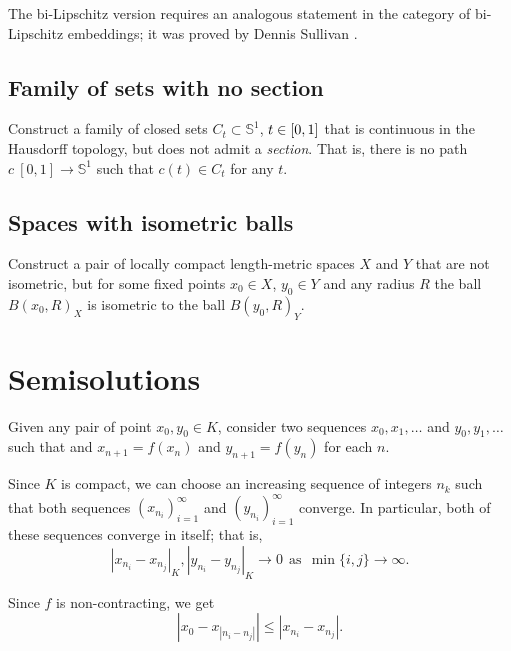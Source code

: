 The  bi-Lipschitz version requires 
an analogous statement in the category of bi-Lipschitz embeddings;
it was proved by
Dennis Sullivan \cite[see][]{sullivan}.

\subsection*{Family of sets with no section\easy}
\label{hausdorff-section} 

\begin{pr}
Construct a family of closed sets $C_t\subset\mathbb{S}^1$, $t\z\in [0,1]$ that is continuous in the Hausdorff topology, 
but does not admit a {}\emph{section}.
That is, there is no path $c\:[0,1]\to \mathbb{S}^1$ such that $c(t)\in C_t$ for any $t$.
\end{pr}

\subsection*{Spaces with isometric balls}

\begin{pr}
Construct a pair of locally compact length-metric spaces $X$ and $Y$ 
that are not isometric,
but for some fixed points $x_0\in X$,  $y_0\in Y$ and any radius $R$
the ball $B(x_0,R)_X$ is 
isometric to the ball $B(y_0,R)_Y$.
\end{pr}



\section*{Semisolutions}



Given any pair of point $x_0,y_0\in K$, 
consider two sequences $x_0,x_1,\dots$ and $y_0,y_1,\dots$
such that 
and $x_{n+1}=f(x_n)$ and $y_{n+1}=f(y_n)$ for each $n$.

Since $K$ is compact, 
we can choose an increasing sequence of integers $n_k$
such that both sequences $(x_{n_i})_{i=1}^\infty$ and $(y_{n_i})_{i=1}^\infty$
converge.
In particular, both of these sequences converge in itself;
that is,
\[
|x_{n_i}-x_{n_j}|_K, |y_{n_i}-y_{n_j}|_K\to 0
\ \ 
\text{as}
\ \ \min\{i,j\}\to\infty.
\]


Since $f$ is non-contracting, we get
\[
|x_0-x_{|n_i-n_j|}|
\le 
|x_{n_i}-x_{n_j}|.
\]

